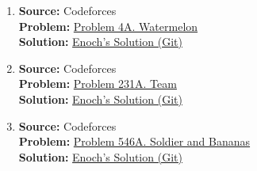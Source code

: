 \documentclass[../../main.tex]{subfiles}
\begin{document}
\begin{enumerate}
\item
\textbf{Source:} Codeforces \\
\textbf{Problem:}
\href{https://codeforces.com/problemset/problem/4/A}{Problem 4A. Watermelon} \\
\textbf{Solution:}
\href{https://github.com/enochyu-official/LibreNotebook/blob/main/src/CS02/CS0201/CS0201.26054-06.cpp}{Enoch's Solution (Git)}

\item
\textbf{Source:} Codeforces \\
\textbf{Problem:}
\href{https://codeforces.com/problemset/problem/231/A}{Problem 231A. Team} \\
\textbf{Solution:}
\href{https://github.com/enochyu-official/LibreNotebook/blob/main/src/CS02/CS0201/CS0201.26054-07.cpp}{Enoch's Solution (Git)}

\item
\textbf{Source:} Codeforces \\
\textbf{Problem:}
\href{https://codeforces.com/problemset/problem/546/A}{Problem 546A. Soldier and Bananas} \\
\textbf{Solution:}
\href{https://github.com/enochyu-official/LibreNotebook/blob/main/src/CS02/CS0201/CS0201.26054-08.cpp}{Enoch's Solution (Git)}
\end{enumerate}
\end{document}

